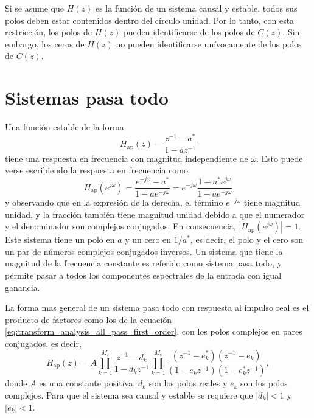 \documentclass[a4paper]{report}
\begin{document}
Si se asume que \(H(z)\) es la función de un sistema causal y estable, todos sus polos deben estar contenidos dentro del círculo unidad. Por lo tanto, con esta restricción, los polos de \(H(z)\) pueden identificarse de los polos de \(C(z)\). Sin embargo, los ceros de \(H(z)\) no pueden identificarse unívocamente de los polos de \(C(z)\).

\section{Sistemas pasa todo}\label{sec:transform_analysis_all_pass_systems}

Una función estable de la forma
\begin{equation}\label{eq:transform_analysis_all_pass_first_order}
 H_\textrm{ap}(z)=\frac{z^{-1}-a^*}{1-az^{-1}} 
\end{equation}
tiene una respuesta en frecuencia con magnitud independiente de \(\omega\). Esto puede verse escribiendo la respuesta en frecuencia como
\begin{equation}\label{eq:transform_analysis_all_pass_first_order_alt}
 H_\textrm{ap}(e^{j\omega})=\frac{e^{-j\omega}-a^*}{1-ae^{-j\omega}}
  =e^{-j\omega}\frac{1-a^*e^{j\omega}}{1-ae^{-j\omega}} 
\end{equation}
y observando que en la expresión de la derecha, el término \(e^{-j\omega}\) tiene magnitud unidad, y la fracción también tiene magnitud unidad debido a que el numerador y el denominador son complejos conjugados. En consecuencia, \(|H_\textrm{ap}(e^{j\omega})|=1\). Este sistema tiene un polo en \(a\) y un cero en \(1/a^*\), es decir, el polo y el cero son un par de números complejos conjugados inversos. 
Un sistema que tiene la magnitud de la frecuencia constante es referido como sistema pasa todo, y permite pasar a todos los componentes espectrales de la entrada con igual ganancia.

La forma mas general de un sistema pasa todo con respuesta al impulso real es el producto de factores como los de la ecuación \ref{eq:transform_analysis_all_pass_first_order}, con los polos complejos en pares conjugados, es decir,
\begin{equation}\label{eq:transform_analysis_all_pass_generic}
 H_\textrm{ap}(z)=A\prod_{k=1}^{M_r}\frac{z^{-1}-d_k}{1-d_kz^{-1}}\prod_{k=1}^{M_c}\frac{(z^{-1}-e_k^*)(z^{-1}-e_k)}{(1-e_kz^{-1})(1-e^*_kz^{-1})}, 
\end{equation}
donde \(A\) es una constante positiva, \(d_k\) son los polos reales y \(e_k\) son los polos complejos. Para que el sistema sea causal y estable se requiere que \(|d_k|<1\) y \(|e_k|<1\).
\end{document}
